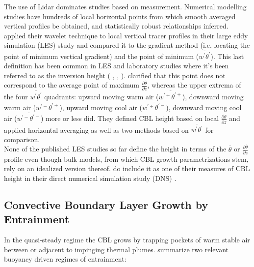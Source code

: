 The use of Lidar dominates studies based on measurement. Numerical modelling studies have hundreds of local horizontal points
from which smooth averaged vertical profiles be obtained, and statistically robust relationships inferred. 
\citeauthor{BrooksFowler2} \cite{BrooksFowler2} applied their wavelet technique to local vertical tracer profiles 
in their large eddy simulation (\acs{LES}) study and compared it to the gradient method (i.e. locating the point of minimum vertical gradient)
and the point of minimum ($\overline{w^{'}\theta^{'}}$).  This last definition has been common
in \acs{LES} and laboratory studies where it's been referred to as the inversion height (\citeauthor{DearWill80} 
\cite{DearWill80}, \citeauthor{Sorbjan1} \cite{Sorbjan1}, \citeauthor{FedConzMir04} \cite{FedConzMir04}).
 \citeauthor{SullMoengStev} \cite{SullMoengStev} clarified that this point does not correspond to the average point of maximum $\frac{\partial \overline{\theta}}{\partial z}$, whereas the upper extrema of the four $\overline{w^{'}\theta^{'}}$ quadrants: upward moving warm air ($\overline{w^{'+}\theta^{'+}}$), downward moving warm air ($\overline{w^{'-}\theta^{'+}}$), 
upward moving cool air ($\overline{w^{'+}\theta^{'-}}$), downward moving cool air ($\overline{w^{'-}\theta^{'-}}$) 
more or less did. They defined \acs{CBL} height based on local $\frac{\partial \theta}{\partial z}$
and applied horizontal averaging as well as two methods based on $\overline{w^{'}\theta^{'}}$
for comparison.\\

None of the published \acs{LES} studies so far define the height in terms of the $\overline{\theta}$ or 
$\frac{\partial \overline{\theta}}{\partial z}$ profile even though bulk models, from which 
\acs{CBL} growth parametrizations stem, rely on an idealized version thereof.
\citeauthor{GarciaMellado} do include it as one of their measures of \acs{CBL} height in their direct numerical
simulation study (\acs{DNS}) \cite{GarciaMellado}.       

\subsection{Convective Boundary Layer Growth by Entrainment}
\label{subsec:}

In the quasi-steady regime the \acs{CBL} grows by trapping pockets of warm stable air between
or adjacent to impinging thermal plumes.  \citeauthor{Traum11} \cite{Traum11} summarize two
relevant buoyancy driven regimes of entrainment:\\

